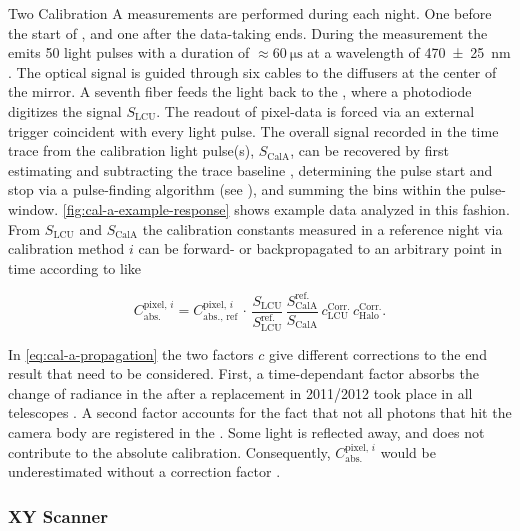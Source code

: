 Two Calibration A measurements are performed during each night. One before the 
start of \DAQ, and one after the data-taking ends. During the measurement the 
\LED emits 50 light pulses with a duration of $\approx\SI{60}{\micro\second}$ at
a wavelength of \SI{470\pm25}{\nano\meter} \cite{menshikovLEDCalibrationUnit}. 
The optical signal is guided through six cables to the diffusers at the center 
of the mirror. A seventh fiber feeds the light back to the \LCU, where a
photodiode digitizes the signal $S_\mathrm{LCU}$. The readout of pixel-data is 
forced via an external trigger coincident with every light pulse. The overall
signal recorded in the \FD time trace from the calibration light pulse(s),
$S_\mathrm{CalA}$, can be recovered by first estimating and subtracting the 
trace baseline \cite{schaferReconstructionBaselineUndershoot2022}, determining 
the pulse start and stop via a pulse-finding algorithm (see ), and summing the \ADC bins within the pulse-window. 
\cref{fig:cal-a-example-response} shows example data analyzed in this fashion. 
From $S_\mathrm{LCU}$ and $S_\mathrm{CalA}$ the calibration constants measured 
in a reference night via calibration method $i$ can be forward- or 
backpropagated to an arbitrary point in time according to 
\cite{salinaNewCalibrationTask2014, salinaAnalisiDatiXY2025} like

\begin{equation}
\label{eq:cal-a-propagation}
C^{\mathrm{pixel},\,i}_{\mathrm{abs.}} = C^{\mathrm{pixel},\,i}_{\mathrm{abs.},\,\mathrm{ref}}\,\cdot\,\frac{S_\mathrm{LCU}}{S_\mathrm{LCU}^\mathrm{ref.}}\,\frac{S_\mathrm{CalA}^\mathrm{ref.}}{S_\mathrm{CalA}}\,c_\mathrm{LCU}^\mathrm{Corr.}\,c^\mathrm{Corr.}_\mathrm{Halo}.
\end{equation}

In \cref{eq:cal-a-propagation} the two factors $c$ give different corrections
to the end result that need to be considered. First, a time-dependant factor 
absorbs the change of radiance in the \LCU \LED after a replacement in 2011/2012
took place in all telescopes \cite{menshikovLEDCalibrationUnit}. A second factor
accounts for the fact that not all photons that hit the camera body are 
registered in the \PMTs. Some light is reflected away, and does not contribute
to the absolute calibration. Consequently, 
$C^{\mathrm{pixel},\,i}_\mathrm{abs.}$ would be underestimated without a 
correction factor \cite{brackFluorescenceDetectorAbsolute13}.

\subsubsection{XY Scanner}

